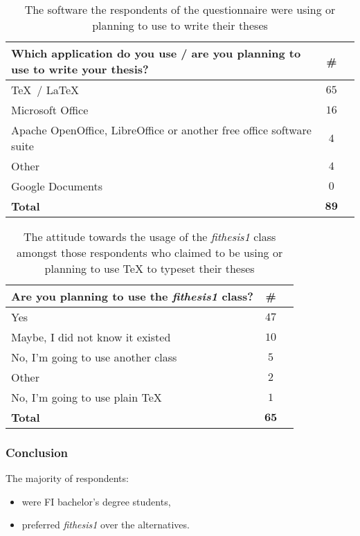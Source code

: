\documentclass[11pt,twoside]{article}
\def\pkg#1{{\sf#1}}
\let\pkg\emph
\let\oldframetitle\frametitle
\def\frametitle#1{\oldframetitle{#1}\noindent}
\begin{document}
\begin{frame}
  \begin{table}[!b]
    \begin{tabularx}{\textwidth}{Xcr}
      \textbf{Which application do you use / are you planning to
      use to write your thesis?} & \textbf{\#} \\
      \toprule
      \TeX\ / \LaTeX          & $65$          \\
      Microsoft Office        & $16$          \\
      Apache OpenOffice, LibreOffice or another free office
      software suite          & $4$           \\
      Other                   & $4$           \\
      Google Documents        & $0$           \\
      \bottomrule
      \textbf{Total}          & $\mathbf{89}$ 
    \end{tabularx}
    \caption{The software the respondents of the questionnaire
      were using or planning to use to write their theses}
  \end{table}
\end{frame}
\begin{frame}
  \begin{table}[!b]
    \begin{tabularx}{\textwidth}{Xcr}
      \textbf{Are you planning to use the \pkg{fithesis1}
        class?} & \textbf{\#} \\
      \toprule    Yes                       & $47$
      \\ Maybe, I did not know it existed   & $10$
      \\ No, I'm going to use another class & $5$
      \\ Other                              & $2$
      \\ No, I'm going to use plain \TeX{}  & $1$
      \\ \bottomrule
      \textbf{Total}  & $\mathbf{65}$ 
    \end{tabularx}
      \caption{The attitude towards the usage of the \pkg{fithesis1}
      class amongst those respondents who claimed to be using or
      planning to use \TeX{} to typeset their theses}
  \end{table}
\end{frame}
\begin{frame}
  \frametitle{Conclusion}
  The majority of respondents:
  \begin{itemize}
    \item were FI bachelor's degree students,
    \item preferred \pkg{fithesis1} over the alternatives.
  \end{itemize}
\end{frame}\FloatBarrier
\end{document}
